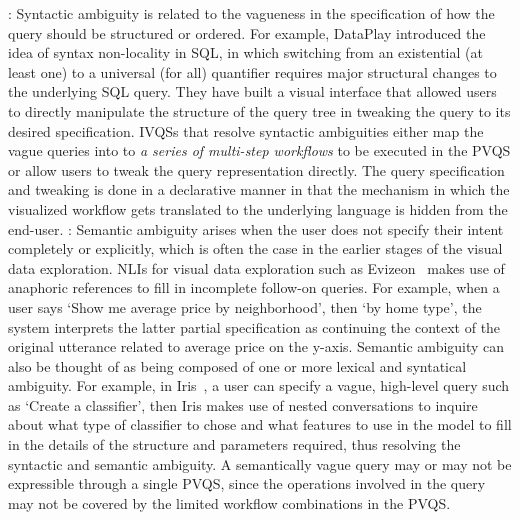 : Syntactic ambiguity is related to the vagueness in the specification of how the query should be structured or ordered. For example, DataPlay introduced the idea of syntax non-locality in SQL, in which switching from an existential (at least one) to a universal (for all) quantifier requires major structural changes to the underlying SQL query. They have built a visual interface that allowed users to directly manipulate the structure of the query tree in tweaking the query to its desired specification. IVQSs that resolve syntactic ambiguities either map the vague queries into to \textit{a series of multi-step workflows} to be executed in the PVQS or allow users to tweak the query representation directly. The query specification and tweaking is done in a declarative manner in that the mechanism in which the visualized workflow gets translated to the underlying language is hidden from the end-user. 
: Semantic ambiguity arises when the user does not specify their intent completely or explicitly, which is often the case in the earlier stages of the visual data exploration. NLIs for visual data exploration such as Evizeon~\cite{Hoque2017} makes use of anaphoric references to fill in incomplete follow-on queries. For example, when a user says `Show me average price by neighborhood', then `by home type', the system interprets the latter partial specification as continuing the context of the original utterance related to average price on the y-axis. Semantic ambiguity can also be thought of as being composed of one or more lexical and syntatical ambiguity. For example, in Iris~\cite{Fast2018}, a user can specify a vague, high-level query such as `Create a classifier', then Iris makes use of nested conversations to inquire about what type of classifier to chose and what features to use in the model to fill in the details of the structure and parameters required, thus resolving the syntactic and semantic ambiguity. A semantically vague query may or may not be expressible through a single PVQS, since the operations involved in the query may not be covered by the limited workflow combinations in the PVQS. 


